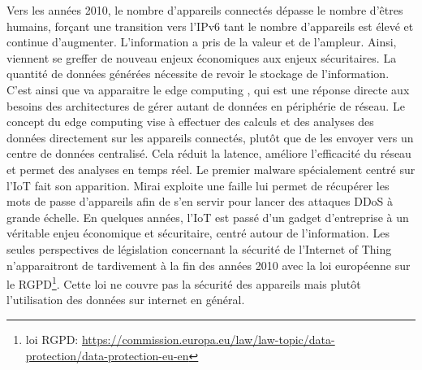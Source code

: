 Vers les années 2010, le nombre d'appareils connectés dépasse le nombre d'êtres humains, forçant une transition vers l'IPv6 tant le nombre d'appareils est élevé et continue d'augmenter. L'information a pris de la valeur et de l'ampleur. Ainsi, viennent se greffer de nouveau enjeux économiques aux enjeux sécuritaires. La quantité de données générées nécessite de revoir le stockage de l'information. C'est ainsi que va apparaitre le edge computing \cite{edge}, qui est une réponse directe aux besoins des architectures de gérer autant de données en périphérie de réseau. Le concept du edge computing vise à effectuer des calculs et des analyses des données directement sur les appareils connectés, plutôt que de les envoyer vers un centre de données centralisé. Cela réduit la latence, améliore l'efficacité du réseau et permet des analyses en temps réel. Le premier malware spécialement centré sur l'\ac{IoT} fait son apparition. Mirai\cite{Mirai} exploite une faille lui permet de récupérer les mots de passe d'appareils afin de s'en servir pour lancer des attaques \ac{DDoS} à grande échelle. En quelques années, l'\ac{IoT} est passé d'un gadget d'entreprise à un véritable enjeu économique et sécuritaire, centré autour de l'information. Les seules perspectives de législation concernant la sécurité de l'Internet of Thing n'apparaitront de tardivement à la fin des années 2010 avec la loi européenne sur le \ac{RGPD}\footnote{loi RGPD: \href{https://commission.europa.eu/law/law-topic/data-protection/data-protection-eu_en}{{https://commission.europa.eu/law/law-topic/data-protection/data-protection-eu-en}}}. Cette loi ne couvre pas la sécurité des appareils mais plutôt l'utilisation des données sur internet en général.

\vspace{0.1cm}

